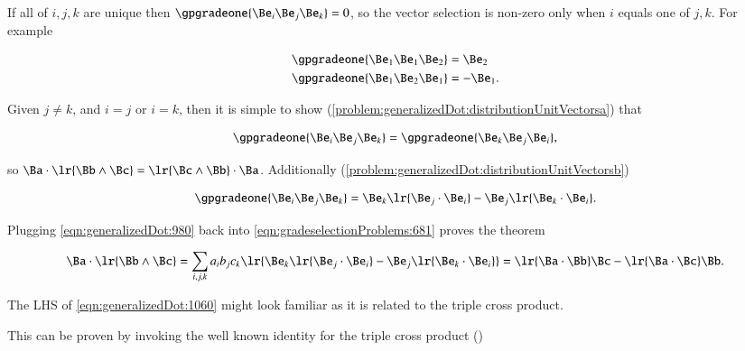If all of \( i, j, k \) are unique then \( \gpgradeone{ \Be_i \Be_j \Be_k } = 0 \), so the vector selection is non-zero only when \( i \) equals one of \( j, k \).
For example

\begin{dmath}\label{eqn:generalizedDot:1040}
\begin{aligned}
\gpgradeone{ \Be_1 \Be_1 \Be_2 } &= \Be_2 \\
\gpgradeone{ \Be_1 \Be_2 \Be_1 } &= -\Be_1.
\end{aligned}
\end{dmath}

Given \( j \ne k \), and \( i = j \) or \( i = k \),  then it is simple to show
(\cref{problem:generalizedDot:distributionUnitVectorsa})
that

\begin{equation}\label{eqn:generalizedDot:1020}
\gpgradeone{ \Be_i \Be_j \Be_k }
= \gpgradeone{ \Be_k \Be_j \Be_i },
\end{equation}

so \( \Ba \cdot \lr{ \Bb \wedge \Bc } = \lr{ \Bc \wedge \Bb } \cdot \Ba \).
Additionally
(\cref{problem:generalizedDot:distributionUnitVectorsb})

\begin{equation}\label{eqn:generalizedDot:980}
\gpgradeone{ \Be_i \Be_j \Be_k }
=
\Be_k \lr{ \Be_j \cdot \Be_i }
-\Be_j \lr{ \Be_k \cdot \Be_i }.
\end{equation}

Plugging \cref{eqn:generalizedDot:980} back into \cref{eqn:gradeselectionProblems:681} proves the theorem

\begin{dmath}\label{eqn:generalizedDot:1060}
\Ba \cdot \lr{ \Bb \wedge \Bc }
= \sum_{i, j, k} a_i b_j c_k \lr{ \Be_k \lr{ \Be_j \cdot \Be_i }
-\Be_j \lr{ \Be_k \cdot \Be_i } }
=
\lr{ \Ba \cdot \Bb } \Bc
- \lr{ \Ba \cdot \Bc } \Bb.
\end{dmath}

The LHS of \cref{eqn:generalizedDot:1060} might look familiar as it is related to the  triple cross product.

This can be proven by invoking the well known
identity for the triple cross product
(\citep{jackson1975cew})

